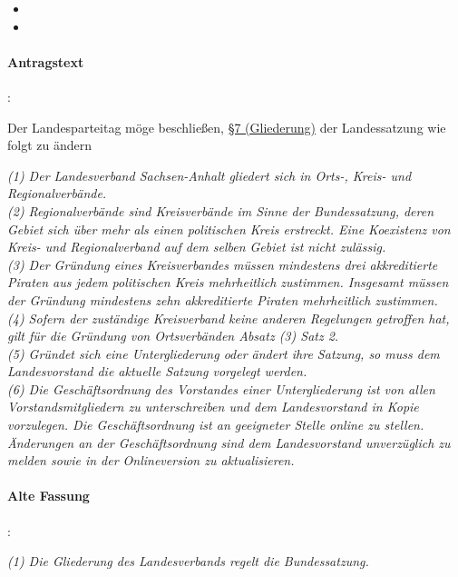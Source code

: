 
\label{satzung:gliederungen2}
\begin{itemize}
\item {}
\item {}
\end{itemize}

\paragraph{Antragstext}:

Der Landesparteitag möge beschließen, \href{http://wiki.piratenpartei.de/LSA:Satzung#.C2.A7_7_-_Gliederung}{§7 (Gliederung)} der Landessatzung wie folgt zu ändern

\textit{(1) Der Landesverband Sachsen-Anhalt gliedert sich in Orts-, Kreis- und Regionalverbände.\\
(2) Regionalverbände sind Kreisverbände im Sinne der Bundessatzung, deren Gebiet sich über mehr als einen politischen Kreis erstreckt. Eine Koexistenz von Kreis- und Regionalverband auf dem selben Gebiet ist nicht zulässig.\\
(3) Der Gründung eines Kreisverbandes müssen mindestens drei akkreditierte Piraten aus jedem politischen Kreis mehrheitlich zustimmen. Insgesamt müssen der Gründung mindestens zehn akkreditierte Piraten mehrheitlich zustimmen.\\
(4) Sofern der zuständige Kreisverband keine anderen Regelungen getroffen hat, gilt für die Gründung von Ortsverbänden Absatz (3) Satz 2.\\
(5) Gründet sich eine Untergliederung oder ändert ihre Satzung, so muss dem Landesvorstand die aktuelle Satzung vorgelegt werden.\\
(6) Die Geschäftsordnung des Vorstandes einer Untergliederung ist von allen Vorstandsmitgliedern zu unterschreiben und dem Landesvorstand in Kopie vorzulegen. Die Geschäftsordnung ist an geeigneter Stelle online zu stellen. Änderungen an der Geschäftsordnung sind dem Landesvorstand unverzüglich zu melden sowie in der Onlineversion zu aktualisieren.}

\paragraph{Alte Fassung}:

\textit{(1) Die Gliederung des Landesverbands regelt die Bundessatzung.}

